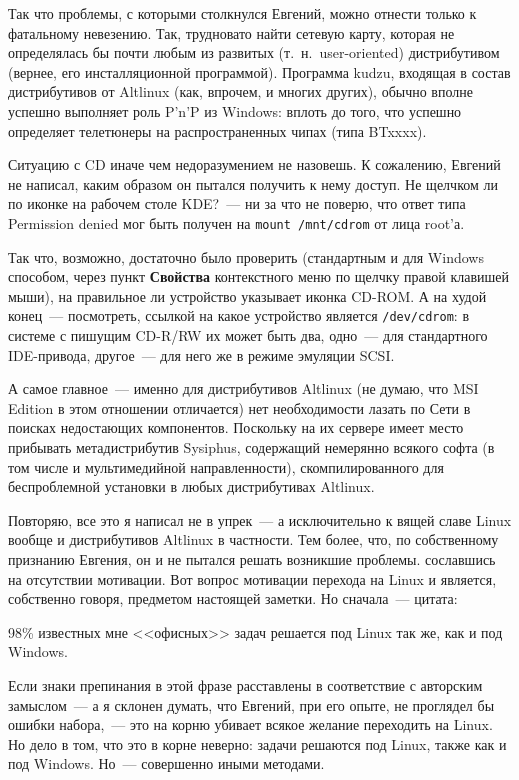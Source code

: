 Так что проблемы, с которыми столкнулся Евгений, можно отнести только к фатальному невезению. Так, трудновато найти сетевую карту, которая не определялась бы почти любым из развитых (т.~н.~user-oriented) дистрибутивом (вернее, его инсталляционной программой). Программа kudzu, входящая в состав дистрибутивов от Altlinux (как, впрочем, и многих других), обычно вполне успешно выполняет роль P'n'P из Windows: вплоть до того, что успешно определяет телетюнеры на распространенных чипах (типа BTxxxx).

Ситуацию с CD иначе чем недоразумением не назовешь. К сожалению, Евгений не написал, каким образом он пытался получить к нему доступ. Не щелчком ли по иконке на рабочем столе KDE?~--- ни за что не поверю, что ответ типа Permission denied мог быть получен на \texttt{mount /mnt/cdrom} от лица root'а.

Так что, возможно, достаточно было проверить (стандартным и для Windows способом, через пункт \textbf{Свойства} контекстного меню по щелчку правой клавишей мыши), на правильное ли устройство указывает иконка CD-ROM. А на худой конец~--- посмотреть, ссылкой на какое устройство является \texttt{/dev/cdrom}: в системе с пишущим CD-R/RW их может быть два, одно~--- для стандартного IDE-привода, другое~--- для него же в режиме эмуляции SCSI.

А самое главное~--- именно для дистрибутивов Altlinux (не думаю, что MSI Edition в этом отношении отличается) нет необходимости лазать по Сети в поисках недостающих компонентов. Поскольку на их сервере имеет место прибывать метадистрибутив Sysiphus, содержащий немерянно всякого софта (в том числе и мультимедийной направленности), скомпилированного для беспроблемной установки в любых дистрибутивах Altlinux.

Повторяю, все это я написал не в упрек~--- а исключительно к вящей славе Linux вообще и дистрибутивов Altlinux в частности. Тем более, что, по собственному признанию Евгения, он и не пытался решать возникшие проблемы. сославшись на отсутствии мотивации. Вот вопрос мотивации перехода на Linux и является, собственно говоря, предметом настоящей заметки. Но сначала~--- цитата:

\begin{shadequote}{}
98\% известных мне <<офисных>> задач решается под Linux так же, как и под Windows. 
\end{shadequote}

Если знаки препинания в этой фразе расставлены в соответствие с авторским замыслом~--- а я склонен думать, что Евгений, при его опыте, не проглядел бы ошибки набора,~--- это на корню убивает всякое желание переходить на Linux. Но дело в том, что это в корне неверно: задачи решаются под Linux, также как и под Windows. Но~--- совершенно иными методами. 

